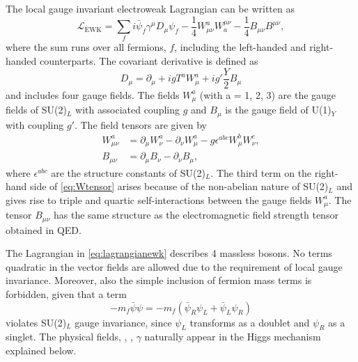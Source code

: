The local gauge invariant electroweak Lagrangian can be written as
\begin{equation}
  \mathcal{L}_{\text{EWK}} = \sum_f i\bar{\psi}_{f}\gamma^\mu D_\mu \psi_{f} - \frac{1}{4}W_{\mu\nu}^aW^{\mu\nu}_{a} - \frac{1}{4} B_{\mu\nu}B^{\mu\nu}, 
  \label{eq:lagrangianewk}
\end{equation}
where the sum runs over all fermions, $f$, including the left-handed and right-handed counterparts.
The covariant derivative is defined as
\begin{equation}
  D_\mu = \partial_\mu + igT^aW_\mu^a + ig'\frac{Y}{2}B_\mu 
  \label{eq:covdevewk}
\end{equation}
and includes four gauge fields. The fields $W^a_\mu$ (with a = 1, 2, 3) are the gauge fields of SU(2)$_L$ with associated coupling $g$ and $B_\mu$ is the gauge field of U(1)$_Y$ with coupling $g'$.
The field tensors are given by
\begin{align}
  W_{\mu\nu}^a & = \partial_\mu W_\nu^a - \partial_\nu W_\mu^a - g \epsilon^{abc} W^b_\mu W^c_\nu, \label{eq:Wtensor} \\
  B_{\mu\nu}   & = \partial_\mu B_\nu - \partial_\nu B_\mu,
\end{align}
where $\epsilon^{abc}$ are the structure constants of SU(2)$_L$. The third term on the right-hand side of \cref{eq:Wtensor} arises because of the non-abelian nature of SU(2)$_L$ and gives rise to triple and quartic self-interactions between the gauge fields $W_{\mu}^a$.
The tensor $B_{\mu\nu}$ has the same structure as the electromagnetic field strength tensor obtained in QED.

The Lagrangian in \cref{eq:lagrangianewk} describes 4 massless bosons. No terms quadratic in the vector fields are allowed due to the requirement of local gauge invariance. Moreover, also the simple inclusion of fermion mass terms is forbidden, given that a term
\begin{equation}
  -m_f \bar{\psi} \psi = -m_f \left( \bar{\psi}_R\psi_L + \bar{\psi}_L\psi_R \right)
  \label{eq:fermionmassterm}
\end{equation}
violates SU(2)$_L$ gauge invariance, since $\psi_L$ transforms as a doublet and $\psi_R$ as a singlet. The physical fields, \Wpm, \Zboson, $\gamma$ naturally appear in the Higgs mechanism explained below.









